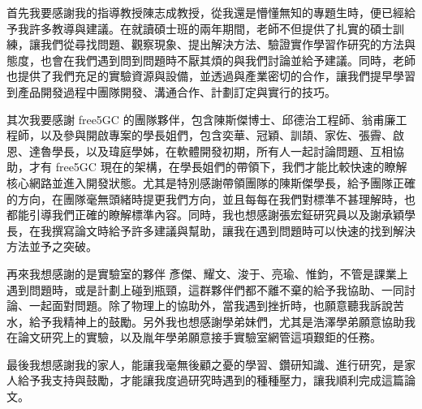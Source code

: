 \begin{acknowledgement}%

    首先我要感謝我的指導教授陳志成教授，從我還是懵懂無知的專題生時，便已經給予我許多教導與建議。在就讀碩士班的兩年期間，老師不但提供了扎實的碩士訓練，讓我們從尋找問題、觀察現象、提出解決方法、驗證實作學習作研究的方法與態度，也會在我們遇到問到問題時不厭其煩的與我們討論並給予建議。同時，老師也提供了我們充足的實驗資源與設備，並透過與產業密切的合作，讓我們提早學習到產品開發過程中團隊開發、溝通合作、計劃訂定與實行的技巧。

    其次我要感謝 free5GC 的團隊夥伴，包含陳斯傑博士、邱德治工程師、翁甫廉工程師，以及參與開啟專案的學長姐們，包含奕華、冠穎、訓頡、家佐、張霽、啟恩、達魯學長，以及瑋庭學姊，在軟體開發初期，所有人一起討論問題、互相協助，才有 free5GC 現在的架構，在學長姐們的帶領下，我們才能比較快速的瞭解核心網路並進入開發狀態。尤其是特別感謝帶領團隊的陳斯傑學長，給予團隊正確的方向，在團隊毫無頭緒時提更我們方向，並且每每在我們對標準不甚理解時，也都能引導我們正確的瞭解標準內容。同時，我也想感謝張宏鉦研究員以及謝承穎學長，在我撰寫論文時給予許多建議與幫助，讓我在遇到問題時可以快速的找到解決方法並予之突破。

    再來我想感謝的是實驗室的夥伴 彥傑、耀文、浚于、亮瑜、惟鈞，不管是課業上遇到問題時，或是計劃上碰到瓶頸，這群夥伴們都不離不棄的給予我協助、一同討論、一起面對問題。除了物理上的協助外，當我遇到挫折時，也願意聽我訴說苦水，給予我精神上的鼓勵。另外我也想感謝學弟妹們，尤其是浩澤學弟願意協助我在論文研究上的實驗，以及胤年學弟願意接手實驗室網管這項艱鉅的任務。

    最後我想感謝我的家人，能讓我毫無後顧之憂的學習、鑽研知識、進行研究，是家人給予我支持與鼓勵，才能讓我度過研究時遇到的種種壓力，讓我順利完成這篇論文。

\end{acknowledgement}
